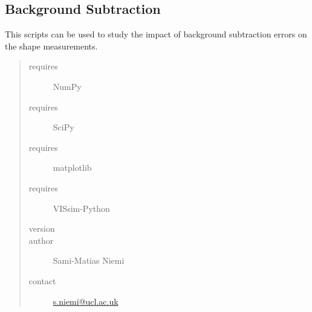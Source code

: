\documentclass[a4paper,11pt,english]{sphinxmanual}
\begin{document}
\subsection{Background Subtraction}
\label{reduction:background-subtraction}
This scripts can be used to study the impact of background subtraction errors on the shape measurements.
\begin{quote}\begin{description}
\item[{requires}] \leavevmode
NumPy

\item[{requires}] \leavevmode
SciPy

\item[{requires}] \leavevmode
matplotlib

\item[{requires}] \leavevmode
VISsim-Python

\item[{version}] 

\item[{author}] \leavevmode
Sami-Matias Niemi

\item[{contact}] \leavevmode
\href{mailto:s.niemi@ucl.ac.uk}{s.niemi@ucl.ac.uk}

\end{description}\end{quote}
\end{document}
